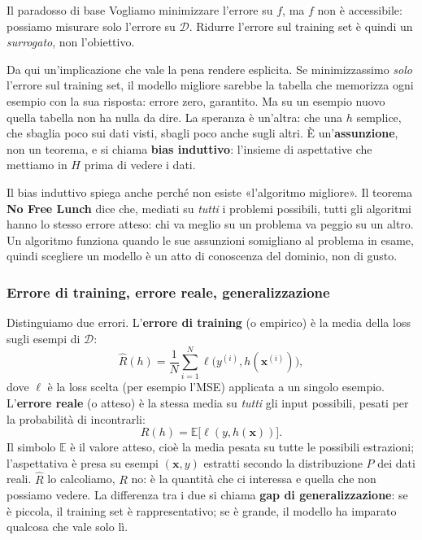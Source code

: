 \documentclass[12pt]{extarticle}
\begin{document}
\begin{ideabox}{Il paradosso di base}
Vogliamo minimizzare l'errore su $f$, ma $f$ non è accessibile: possiamo misurare solo l'errore su $\mathcal{D}$. Ridurre l'errore sul training set è quindi un \emph{surrogato}, non l'obiettivo.
\end{ideabox}

\noindent Da qui un'implicazione che vale la pena rendere esplicita. Se minimizzassimo \emph{solo} l'errore sul training set, il modello migliore sarebbe la tabella che memorizza ogni esempio con la sua risposta: errore zero, garantito. Ma su un esempio nuovo quella tabella non ha nulla da dire. La speranza è un'altra: che una $h$ semplice, che sbaglia poco sui dati visti, sbagli poco anche sugli altri. È un'\textbf{assunzione}, non un teorema, e si chiama \textbf{bias induttivo}: l'insieme di aspettative che mettiamo in $H$ prima di vedere i dati.

\noindent Il bias induttivo spiega anche perché non esiste «l'algoritmo migliore». Il teorema \textbf{No Free Lunch} dice che, mediati su \emph{tutti} i problemi possibili, tutti gli algoritmi hanno lo stesso errore atteso: chi va meglio su un problema va peggio su un altro. Un algoritmo funziona quando le sue assunzioni somigliano al problema in esame, quindi scegliere un modello è un atto di conoscenza del dominio, non di gusto.

\subsubsection{Errore di training, errore reale, generalizzazione}

\noindent Distinguiamo due errori. L'\textbf{errore di training} (o empirico) è la media della loss sugli esempi di $\mathcal{D}$:
\[
\hat{R}(h) = \frac{1}{N}\sum_{i=1}^{N} \ell\bigl(y^{(i)}, h(\mathbf{x}^{(i)})\bigr),
\]
dove $\ell$ è la loss scelta (per esempio l'MSE) applicata a un singolo esempio. L'\textbf{errore reale} (o atteso) è la stessa media su \emph{tutti} gli input possibili, pesati per la probabilità di incontrarli:
\[
R(h) = \mathbb{E}\bigl[\ell(y, h(\mathbf{x}))\bigr].
\]
Il simbolo $\mathbb{E}$ è il valore atteso, cioè la media pesata su tutte le possibili estrazioni; l'aspettativa è presa su esempi $(\mathbf{x},y)$ estratti secondo la distribuzione $P$ dei dati reali. $\hat{R}$ lo calcoliamo, $R$ no: è la quantità che ci interessa e quella che non possiamo vedere. La differenza tra i due si chiama \textbf{gap di generalizzazione}: se è piccola, il training set è rappresentativo; se è grande, il modello ha imparato qualcosa che vale solo lì.
\end{document}
